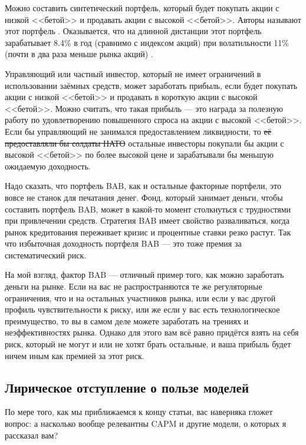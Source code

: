 Можно составить синтетический портфель, который будет покупать акции с низкой 
<<бетой>> и продавать акции с высокой <<бетой>>. Авторы называют этот портфель
. Оказывается, что на 
длинной дистанции этот портфель зарабатывает 8.4\% в год (сравнимо с индексом 
акций) при волатильности 11\% (почти в два раза меньше рынка акций)
\cite{frazzini2014betting}.

Управляющий или частный инвестор, который не имеет ограничений в использовании 
заёмных средств, может заработать прибыль, если будет покупать акции с низкой 
<<бетой>> и продавать в короткую акции с высокой <<бетой>>. Можно считать, что 
такая прибыль --- это награда за полезную работу по удовлетворению повышенного 
спроса на акции с высокой <<бетой>>. Если бы управляющий не занимался 
предоставлением ликвидности, то \sout{её предоставляли бы солдаты НАТО} 
остальные инвесторы покупали бы акции с высокой <<бетой>> по более высокой цене 
и зарабатывали бы меньшую ожидаемую доходность.

Надо сказать, что портфель BAB, как и остальные факторные портфели, это вовсе не
станок для печатания денег. Фонд, который занимает деньги, чтобы составить 
портфель BAB, может в какой-то момент столкнуться с трудностями при привлечении
средств. Стратегия BAB имеет свойство разваливаться, когда рынок кредитования
переживает кризис и процентные ставки резко растут. Так что избыточная 
доходность портфеля BAB --- это тоже премия за систематический риск.

На мой взгляд, фактор BAB --- отличный пример того, как можно заработать деньги 
на рынке. Если на вас не распространяются те же регуляторные ограничения, что и
на остальных участников рынка, или если у вас другой профиль чувствительности к
риску, или же если у вас есть технологическое преимущество, то вы в самом деле 
можете заработать на трениях и неэффективностях рынка. Однако для этого 
вам всё равно придётся взять на себя риск, который не могут и или не хотят 
брать остальные, и ваша прибыль будет ничем иным как премией за этот риск.

\subsection{Лирическое отступление о пользе моделей}

По мере того, как мы приближаемся к концу статьи, вас наверняка гложет вопрос: 
а насколько вообще релевантны CAPM и другие модели, о которых я рассказал вам?

